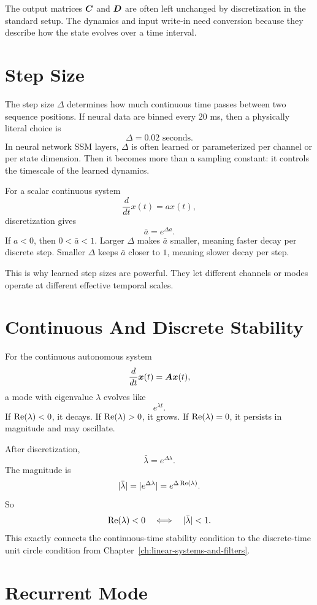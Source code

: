 The output matrices $\bm{C}$ and $\bm{D}$ are often left unchanged by discretization in the
standard setup. The dynamics and input write-in need conversion because they describe
how the state evolves over a time interval.

\section{Step Size}

The step size $\Delta$ determines how much continuous time passes between two sequence
positions. If neural data are binned every $20$ ms, then a physically literal choice is
\[
  \Delta = 0.02 \text{ seconds}.
\]
In neural network SSM layers, $\Delta$ is often learned or parameterized per channel or
per state dimension. Then it becomes more than a sampling constant: it controls the
timescale of the learned dynamics.

For a scalar continuous system
\[
  \frac{d}{dt}x(t)=a x(t),
\]
discretization gives
\[
  \bar{a}=e^{\Delta a}.
\]
If $a<0$, then $0<\bar{a}<1$. Larger $\Delta$ makes $\bar{a}$ smaller, meaning faster
decay per discrete step. Smaller $\Delta$ keeps $\bar{a}$ closer to $1$, meaning slower
decay per step.

This is why learned step sizes are powerful. They let different channels or modes operate
at different effective temporal scales.

\section{Continuous And Discrete Stability}

For the continuous autonomous system
\[
  \frac{d}{dt}\bm{x}(t)=\bm{A}\bm{x}(t),
\]
a mode with eigenvalue $\lambda$ evolves like
\[
  e^{\lambda t}.
\]
If $\operatorname{Re}(\lambda)<0$, it decays. If $\operatorname{Re}(\lambda)>0$, it grows. If
$\operatorname{Re}(\lambda)=0$, it persists in magnitude and may oscillate.

After discretization,
\[
  \bar{\lambda}=e^{\Delta \lambda}.
\]
The magnitude is
\[
  |\bar{\lambda}| = |e^{\Delta \lambda}| = e^{\Delta \operatorname{Re}(\lambda)}.
\]
So
\[
  \operatorname{Re}(\lambda)<0
  \quad \Longleftrightarrow \quad
  |\bar{\lambda}|<1.
\]
This exactly connects the continuous-time stability condition to the discrete-time unit
circle condition from Chapter~\ref{ch:linear-systems-and-filters}.

\section{Recurrent Mode}


